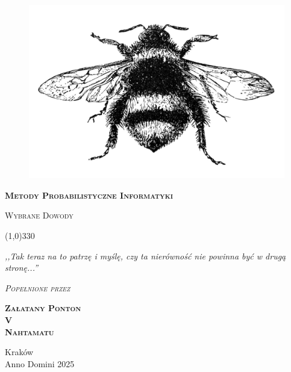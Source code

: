 \begin{titlepage}

	\begin{center}
		\begin{figure}[h]
			\centering
			\includegraphics[scale=0.75]{img/bumblebee.jpg}
		\end{figure}
		\vspace{0.5cm}
		\Huge
		\textbf{\textsc{Metody Probabilistyczne Informatyki}}

		\vspace{0.5cm}
		\Large
		\textsc{Wybrane Dowody}

		\normalsize


		\line(1,0){330}

		\vspace{1cm}
		\textit{,,Tak teraz na to patrzę i myślę, czy ta nierówność nie powinna być w drugą stronę...''}
		\vspace{1cm}

		\textit{\textsc{Popełnione przez}}\\
		\vspace{5mm}

		\textbf{\textsc{
				Załatany Ponton \\
				V\\
				Nahtamatu\\
			}}

		\vfill

		Kraków \\
		Anno Domini 2025

	\end{center}

\end{titlepage}
